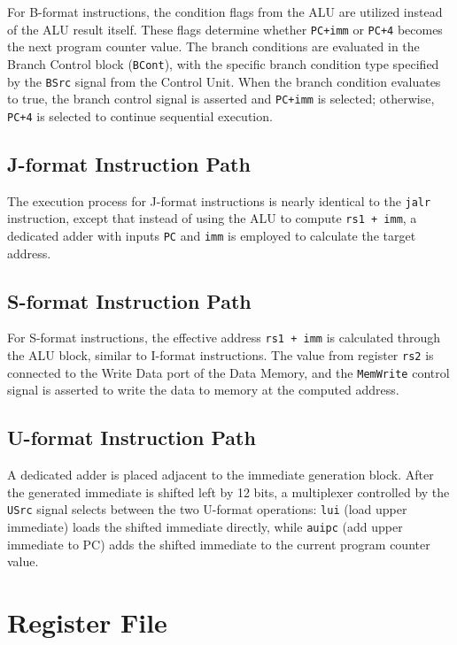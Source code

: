 \documentclass{article}
\begin{document}
For B-format instructions, the condition flags from the ALU are utilized instead of the ALU result itself. These flags determine whether \texttt{PC+imm} or \texttt{PC+4} becomes the next program counter value. The branch conditions are evaluated in the Branch Control block (\texttt{BCont}), with the specific branch condition type specified by the \texttt{BSrc} signal from the Control Unit. When the branch condition evaluates to true, the branch control signal is asserted and \texttt{PC+imm} is selected; otherwise, \texttt{PC+4} is selected to continue sequential execution.

\subsection*{J-format Instruction Path}

The execution process for J-format instructions is nearly identical to the \texttt{jalr} instruction, except that instead of using the ALU to compute \texttt{rs1 + imm}, a dedicated adder with inputs \texttt{PC} and \texttt{imm} is employed to calculate the target address.

\subsection*{S-format Instruction Path}

For S-format instructions, the effective address \texttt{rs1 + imm} is calculated through the ALU block, similar to I-format instructions. The value from register \texttt{rs2} is connected to the Write Data port of the Data Memory, and the \texttt{MemWrite} control signal is asserted to write the data to memory at the computed address.

\subsection*{U-format Instruction Path}

A dedicated adder is placed adjacent to the immediate generation block. After the generated immediate is shifted left by 12 bits, a multiplexer controlled by the \texttt{USrc} signal selects between the two U-format operations: \texttt{lui} (load upper immediate) loads the shifted immediate directly, while \texttt{auipc} (add upper immediate to PC) adds the shifted immediate to the current program counter value.

\section*{Register File}
\end{document}
